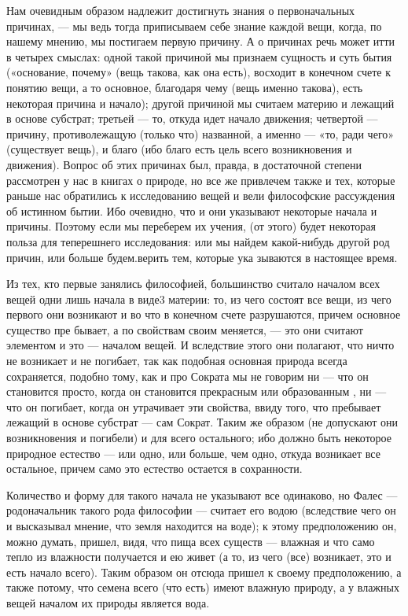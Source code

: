 \documentclass{article}
\begin{document}
Нам очевидным образом надлежит достигнуть знания о первоначальных причинах, --- мы ведь тогда приписываем себе знание каждой вещи, когда, по нашему мнению, мы постигаем первую причину.
\footnotemark[1]
А о причинах речь может итти в четырех смыслах: одной такой причиной мы признаем сущность и суть бытия
\footnotemark[2]
(«основание, почему»
\footnotemark[20]
(вещь такова, как она есть), восходит в конечном счете к понятию вещи, а то основное, благодаря чему (вещь именно такова), есть некоторая причина и начало);
\footnotemark[21]
другой причиной мы считаем материю и лежащий в основе субстрат;
\footnotemark[3]
третьей --- то, откуда идет начало движения; четвертой --- причину, противолежащую (только что) названной, а именно --- «то, ради чего» (существует вещь), и благо (ибо благо есть цель всего возникновения и движения). Вопрос об этих причинах был, правда, в достаточной степени рассмотрен у нас в книгах о природе,
\footnotemark[18]
но все же привлечем также и тех, которые раньше нас обратились к исследованию вещей и вели философские рассуждения об истинном бытии. Ибо очевидно, что и они указывают некоторые начала и причины. Поэтому если мы переберем их учения, (от этого) будет некоторая польза для теперешнего исследования: или мы найдем какой-нибудь другой род причин, или больше будем.верить тем, которые ука зываются в настоящее время.

Из тех, кто первые занялись философией, большинство считало началом всех вещей одни лишь начала в виде3  материи: то, из чего состоят все вещи, из чего первого они возникают и во что в конечном счете разрушаются, причем основное существо пре бывает, а по свойствам своим меняется, --- это они считают элементом и это --- началом вещей. И вследствие этого они полагают, что ничто не возникает и не погибает, так как подобная основная природа
\footnotemark[4]
всегда сохраняется, подобно тому, как и про Сократа мы не говорим ни --- что он становится просто, когда он становится прекрасным или образованным
\footnotemark[5]
, ни --- что он погибает, когда он утрачивает эти свойства, ввиду того, что пребывает лежащий в основе субстрат --- сам Сократ. Таким же образом (не допускают они возникновения и погибели) и для всего остального; ибо должно быть некоторое природное естество
\footnotemark[19]
 --- или одно, или больше, чем одно, откуда возникает все остальное, причем само это естество остается в сохранности.

Количество и форму для такого начала не указывают все одинаково, но Фалес --- родоначальник такого рода философии --- считает его водою (вследствие чего он и высказывал мнение, что земля находится на воде); к этому предположению он, можно думать, пришел, видя, что пища всех существ --- влажная и что само тепло из влажности получается и ею живет (а то, из чего (все) возникает, это и есть начало всего). Таким образом он отсюда пришел к своему предположению, а также потому, что семена всего (что есть) имеют влажную природу, а у влажных вещей началом их природы является вода.
\end{document}
